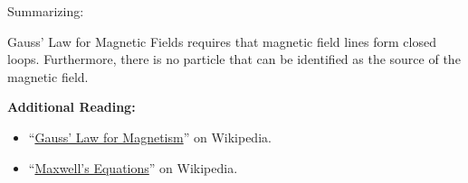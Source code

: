 Summarizing:
%
\begin{mdframed}[backgroundcolor=yellow!20,nobreak=true] 
Gauss' Law for Magnetic Fields requires that magnetic field lines form closed loops.  Furthermore, there is no particle that can be identified as the source of the magnetic field.  
\end{mdframed}


{\bf Additional Reading:}
\begin{itemize}
\item ``\href{https://en.wikipedia.org/wiki/Gauss'_law_for_magnetism}{Gauss' Law for Magnetism}'' on Wikipedia.
\item ``\href{https://en.wikipedia.org/wiki/Maxwell's_equations}{Maxwell's Equations}'' on Wikipedia.
\end{itemize}

